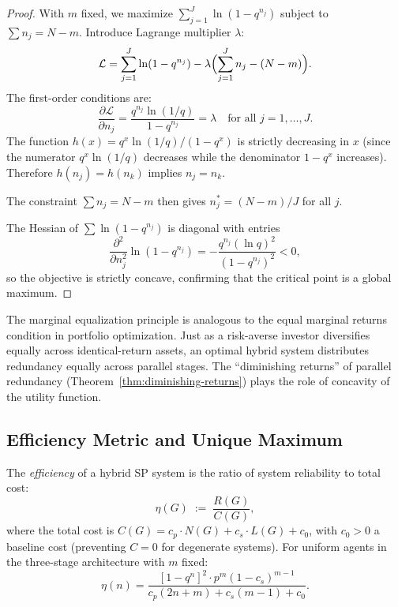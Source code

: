 \begin{proof}
With $m$ fixed, we maximize $\sum_{j=1}^J \ln(1 - q^{n_j})$ subject to
$\sum n_j = N - m$.  Introduce Lagrange multiplier $\lambda$:
\[
  \mathcal{L} = \sum_{j=1}^{J} \ln(1 - q^{n_j}) - \lambda\Bigl(\sum_{j=1}^J n_j - (N-m)\Bigr).
\]
The first-order conditions are:
\[
  \frac{\partial \mathcal{L}}{\partial n_j}
  = \frac{q^{n_j} \ln(1/q)}{1 - q^{n_j}} = \lambda
  \quad \text{for all } j = 1, \ldots, J.
\]
The function $h(x) = q^x \ln(1/q) / (1 - q^x)$ is strictly decreasing in $x$
(since the numerator $q^x \ln(1/q)$ decreases while the denominator $1-q^x$
increases).  Therefore $h(n_j) = h(n_k)$ implies $n_j = n_k$.

The constraint $\sum n_j = N - m$ then gives $n_j^* = (N-m)/J$ for all $j$.

The Hessian of $\sum \ln(1-q^{n_j})$ is diagonal with entries
\[
  \frac{\partial^2}{\partial n_j^2} \ln(1-q^{n_j})
  = -\frac{q^{n_j}(\ln q)^2}{(1-q^{n_j})^2} < 0,
\]
so the objective is strictly concave, confirming that the critical point is a
global maximum.
\end{proof}

\begin{remark}
\label{rmk:r4-portfolio}
The marginal equalization principle is analogous to the equal marginal returns
condition in portfolio optimization.  Just as a risk-averse investor diversifies
equally across identical-return assets, an optimal hybrid system distributes
redundancy equally across parallel stages.  The ``diminishing returns'' of
parallel redundancy (Theorem~\ref{thm:diminishing-returns}) plays the role of
concavity of the utility function.
\end{remark}

\subsection{Efficiency Metric and Unique Maximum}

\begin{definition}
\label{def:r4-efficiency}
The \emph{efficiency} of a hybrid SP system is the ratio of system reliability to
total cost:
\[
  \eta(G) \;:=\; \frac{R(G)}{C(G)},
\]
where the total cost is $C(G) = c_p \cdot N(G) + c_s \cdot L(G) + c_0$, with
$c_0 > 0$ a baseline cost (preventing $C = 0$ for degenerate systems).
For uniform agents in the three-stage architecture with $m$ fixed:
\[
  \eta(n) = \frac{[1-q^n]^2 \cdot p^m (1-c_s)^{m-1}}{c_p(2n + m) + c_s(m-1) + c_0}.
\]
\end{definition}

